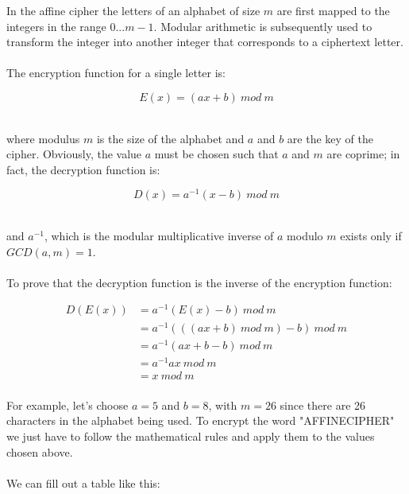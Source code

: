 \documentclass[Lau,binding=0.6cm,oneside]{sapthesis}
\begin{document}
In the affine cipher the letters of an alphabet of size $m$ are first mapped to the integers in the range $0 ... m-1$. Modular arithmetic is subsequently used to transform the integer into another integer that corresponds to a ciphertext letter.\\\\ The encryption function for a single letter is:

\begin{equation}
E{(x)} = (ax + b) \ mod \ m
\end{equation}

\ \\where modulus $m$ is the size of the alphabet and $a$ and $b$ are the key of the cipher. Obviously, the value $a$ must be chosen such that $a$ and $m$ are coprime; in fact, the decryption function is:

\begin{equation}
D{(x)} = a^{-1}(x-b)\ mod \ m
\end{equation}

\ \\and $a^{-1}$, which is the modular multiplicative inverse of $a$ modulo $m$ exists only if $GCD(a, m) = 1$.\\\\
 
To prove that the decryption function is the inverse of the encryption function:

\begin{equation}
\begin{split}
D{(E{(x)})} &= a^{-1}(E{(x)}-b)\ mod\ m\\
				&= a^{-1}(((ax + b) \ mod \ m) - b)\ mod\ m\\
				&= a^{-1}(ax + b - b) \ mod \ m\\
				&= a^{-1}ax \ mod \ m\\
				&= x \ mod \ m\\
\end{split}
\end{equation}

For example, let's choose $a = 5$ and $b = 8$, with $m = 26$ since there are 26 characters in the alphabet being used. To encrypt the word "AFFINECIPHER" we just have to follow the mathematical rules and apply them to the values chosen above. \\\\We can fill out a table like this:\\\\
\end{document}
